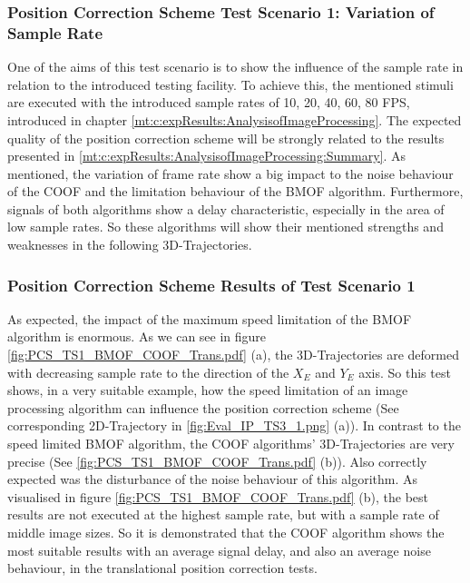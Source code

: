 \subsubsection{Position Correction Scheme Test Scenario 1: Variation of Sample Rate}
One of the aims of this test scenario is to show the influence of the sample rate in relation to the introduced testing facility. To achieve this, the mentioned stimuli are executed with the introduced sample rates of 
10, 20, 40, 60, 80 FPS, introduced in chapter \ref{mt:c:expResults:AnalysisofImageProcessing}. The expected quality of the position correction scheme will be strongly related to the results presented in 
\ref{mt:c:expResults:AnalysisofImageProcessing:Summary}. As mentioned, the variation of frame rate show a big impact to the noise behaviour of the \gls{COOF} and the limitation behaviour of the \gls{BMOF} algorithm. Furthermore, signals of both algorithms show a delay characteristic, especially in the area of low sample rates. So these algorithms will show their mentioned strengths and weaknesses in the following 3D-Trajectories.

\subsubsection{Position Correction Scheme Results of Test Scenario 1}

As expected, the impact of the maximum speed limitation of the \gls{BMOF} algorithm is enormous. As we can see in figure 
\ref{fig:PCS_TS1_BMOF_COOF_Trans.pdf} (a), the 3D-Trajectories are deformed with decreasing sample rate to the direction of the \ensuremath{X_E} and \ensuremath{Y_E} axis. So this test shows, in a very suitable example, how the speed limitation of an image processing algorithm can influence the position correction scheme (See corresponding 2D-Trajectory in \ref{fig:Eval_IP_TS3_1.png} (a)). In contrast to the speed limited \gls{BMOF} algorithm, the \gls{COOF} algorithms' 3D-Trajectories are very precise (See \ref{fig:PCS_TS1_BMOF_COOF_Trans.pdf} (b)). Also correctly expected was the disturbance of the noise behaviour of this algorithm. As visualised in figure \ref{fig:PCS_TS1_BMOF_COOF_Trans.pdf} (b), the best results are not executed at the highest sample rate, but with a sample rate of middle image sizes. So it is demonstrated that the 
\gls{COOF} algorithm shows the most suitable results with an average signal delay, and also an average noise behaviour, in the translational position correction tests.

